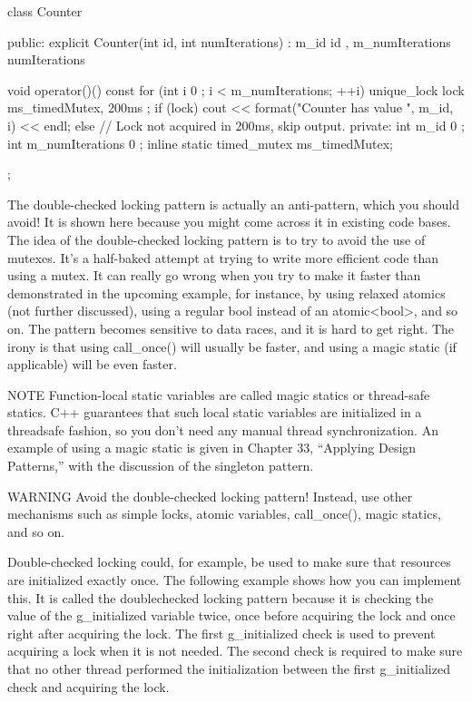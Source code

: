\begin{cpp}
class Counter
{
    public:
        explicit Counter(int id, int numIterations)
            : m_id { id }, m_numIterations { numIterations } { }

        void operator()() const
        {
            for (int i { 0 }; i < m_numIterations; ++i) {
                unique_lock lock { ms_timedMutex, 200ms };
                if (lock) {
                    cout << format("Counter {} has value {}", m_id, i) << endl;
                } else {
                    // Lock not acquired in 200ms, skip output.
                }
            }
        }
    private:
        int m_id { 0 };
        int m_numIterations { 0 };
        inline static timed_mutex ms_timedMutex;
};
\end{cpp}



The double-checked locking pattern is actually an anti-pattern, which you should avoid! It is shown here because you might come across it in existing code bases. The idea of the double-checked locking pattern is to try to avoid the use of mutexes. It’s a half-baked attempt at trying to write more efficient code than using a mutex. It can really go wrong when you try to make it faster than demonstrated in the upcoming example, for instance, by using relaxed atomics (not further discussed), using a regular bool instead of an atomic<bool>, and so on. The pattern becomes sensitive to data races, and it is hard to get right. The irony is that using call\_once() will usually be faster, and using a magic static (if applicable) will be even faster.

\begin{myNotic}{NOTE}
Function-local static variables are called magic statics or thread-safe statics. C++ guarantees that such local static variables are initialized in a threadsafe fashion, so you don’t need any manual thread synchronization. An example of using a magic static is given in Chapter 33, “Applying Design Patterns,” with the discussion of the singleton pattern.
\end{myNotic}

\begin{myWarning}{WARNING}
Avoid the double-checked locking pattern! Instead, use other mechanisms such as simple locks, atomic variables, call\_once(), magic statics, and so on.
\end{myWarning}

Double-checked locking could, for example, be used to make sure that resources are initialized exactly once. The following example shows how you can implement this. It is called the doublechecked locking pattern because it is checking the value of the g\_initialized variable twice, once before acquiring the lock and once right after acquiring the lock. The first g\_initialized check is used to prevent acquiring a lock when it is not needed. The second check is required to make sure that no other thread performed the initialization between the first g\_initialized check and acquiring the lock.

